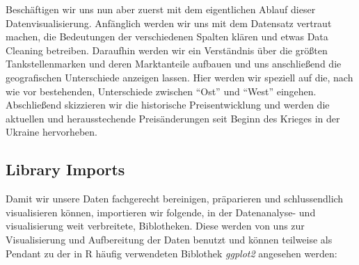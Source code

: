\documentclass[11pt]{article}
\begin{document}
Beschäftigen wir uns nun aber zuerst mit dem eigentlichen Ablauf dieser
Datenvisualisierung. Anfänglich werden wir uns mit dem Datensatz
vertraut machen, die Bedeutungen der verschiedenen Spalten klären und
etwas Data Cleaning betreiben. Daraufhin werden wir ein Verständnis über
die größten Tankstellenmarken und deren Marktanteile aufbauen und uns
anschließend die geografischen Unterschiede anzeigen lassen. Hier werden
wir speziell auf die, nach wie vor bestehenden, Unterschiede zwischen
``Ost'' und ``West'' eingehen. Abschließend skizzieren wir die
historische Preisentwicklung und werden die aktuellen und
herausstechende Preisänderungen seit Beginn des Krieges in der Ukraine
hervorheben.

    \hypertarget{library-imports}{%
\subsection{Library Imports}\label{library-imports}}

    Damit wir unsere Daten fachgerecht bereinigen, präparieren und
schlussendlich visualisieren können, importieren wir folgende, in der
Datenanalyse- und visualisierung weit verbreitete, Biblotheken. Diese
werden von uns zur Visualisierung und Aufbereitung der Daten benutzt und
können teilweise als Pendant zu der in R häufig verwendeten Biblothek
\emph{ggplot2} angesehen werden:
\end{document}
